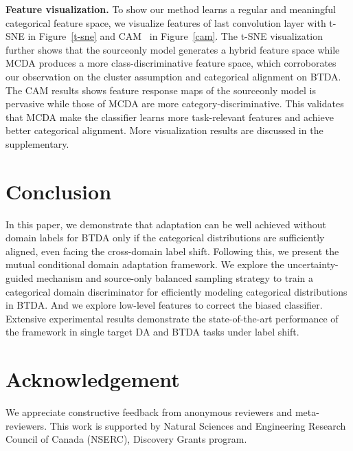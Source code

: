 \documentclass[letterpaper]{article} \usepackage{aaai23}  \usepackage{times}  \usepackage{helvet}  \usepackage{courier}  \usepackage[hyphens]{url}  \usepackage{graphicx} \urlstyle{rm} \def\UrlFont{\rm}  \usepackage{natbib}  \usepackage{caption} \frenchspacing  \setlength{\pdfpagewidth}{8.5in}  \setlength{\pdfpageheight}{11in}
\begin{document}
\noindent\textbf{Feature visualization.} To show our method learns a regular and meaningful categorical feature space, we visualize features of last convolution layer with t-SNE in Figure~\ref{t-sne} and CAM~\cite{selvaraju2017grad} in Figure~\ref{cam}. The t-SNE visualization further shows that the sourceonly model generates a hybrid feature space while MCDA produces a more class-discriminative feature space, which corroborates our observation on the cluster assumption and categorical alignment on BTDA. The CAM results shows feature response maps of the sourceonly model is pervasive while those of MCDA are more category-discriminative. This validates that MCDA make the classifier learns more task-relevant features and achieve better categorical alignment. More visualization results are discussed in the supplementary. 

\section{Conclusion}
In this paper, we demonstrate that adaptation can be well achieved without domain labels for BTDA only if the categorical distributions are sufficiently aligned, even facing the cross-domain label shift. Following this, we present the mutual conditional domain adaptation framework. We explore the uncertainty-guided mechanism and source-only balanced sampling strategy to train a categorical domain discriminator for efficiently modeling categorical distributions in BTDA. And we explore low-level features to correct the biased classifier. Extensive experimental results demonstrate the state-of-the-art performance of the framework in single target DA and BTDA tasks under label shift.

\section{Acknowledgement}
We appreciate constructive feedback from anonymous reviewers and meta-reviewers. This work is supported by Natural Sciences and Engineering Research Council of Canada (NSERC), Discovery Grants program.



\end{document}
